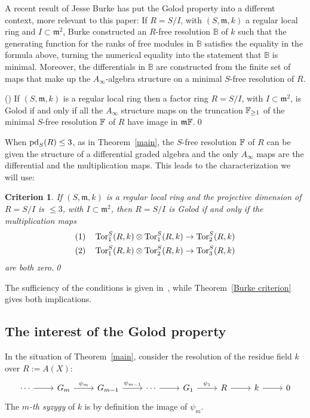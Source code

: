 \documentclass[11pt]{amsart}
\def\gm{{\mathfrak m}}
\newtheorem{criterion}[theorem]{Criterion}
\begin{document}
\def\BB{{\mathbb B}}
A recent result of Jesse Burke has put the Golod property into a different context, more relevant to this paper: If $R = S/I$, with
$(S,\gm,k)$ a regular local ring and $I\subset \gm^2$, Burke constructed an $R$-free resolution $\BB$ of $k$ such that the generating function for the ranks of free modules in $\BB$ satisfies the equality in the formula above, turning the numerical equality into the statement that $\BB$ is minimal. Moreover, the differentials in $\BB$ are constructed from the finite set of
maps that make up the $A_\infty$-algebra structure on a minimal $S$-free resolution of $R$. 

\begin{theorem} (\cite[Definition 6.1 and Theorem~6.13]{Burke})\label{Burke criterion}
 If $(S,\gm, k)$ is a regular local ring then a factor ring $R= S/I$, with $I\subset \gm^{2}$, is Golod if and only if all the
 $A_{\infty}$ structure maps on the truncation ${\mathbb F}_{\geq 1}$ of the minimal $S$-free resolution ${\mathbb F}$ of $R$  have image in $\gm \FF$.\qed
\end{theorem}

When $\operatorname{pd}_S(R)\leq 3$, as in Theorem~\ref{main}, the $S$-free resolution ${\mathbb F}$ of $R$ can be given the structure of a differential graded algebra \cite{Gor3}
and the only $A_\infty$ maps are the differential and the multiplication maps.
 This leads to the characterization we will use:

\begin{criterion}\label{criterion}
If $(S,\gm,k)$ is a regular local ring and the projective dimension of $R = S/I$ is $\leq 3$,
with $I\subset \gm^{2}$,
then
 $R = S/I$  is Golod if and only if the multiplication maps
 $$\begin{aligned}
 (1)\quad \operatorname{Tor}_{1}^{S}(R,k) \otimes \operatorname{Tor}_{1}^{S}(R,k) &\to \operatorname{Tor}_{2}^{S}(R,k) \\
 (2)\quad \operatorname{Tor}_{1}^{S}(R,k) \otimes \operatorname{Tor}_{2}^{S}(R,k) &\to \operatorname{Tor}_{3}^{S}(R,k)
\end{aligned}
$$
are both zero.\qed
\end{criterion}
The sufficiency of the conditions is given in~\cite[Proposition 5.2.4(4)]{AvramovInfinite}, while Theorem~\ref{Burke criterion} gives both implications.

\subsection{The interest of the Golod property}

In the situation of Theorem~\ref{main}, consider the resolution of the residue field $k$ over 
$R:=A(X)$:
$$
\begin{tikzcd}
 \cdots\ar[r]& G_m\ar[r,"\psi_m"] &G_{m-1} \ar[r, "\psi_{m-1}"]&\cdots \ar[r] &G_1\ar[r, "\psi_1"] &R\ar[r]&k \ar[r] &0
\end{tikzcd}
$$
The \emph{$m$-th syzygy} of $k$ is by definition the image of $\psi_m$.
\end{document}
